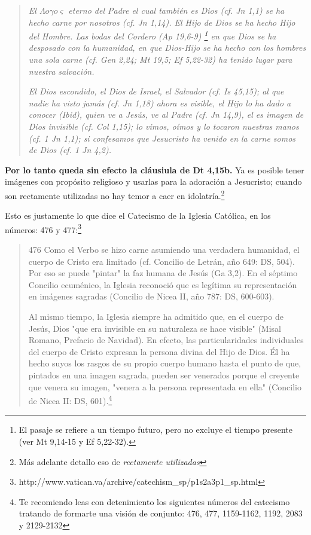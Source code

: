 \documentclass{article}
\begin{document}
\begin{quote}
\emph{El $\Lambda o \gamma o \varsigma$ eterno del Padre el cual tambi\'en es Dios (\emph{cf}. Jn 1,1) se ha hecho \emph{carne} por nosotros (\emph{cf}. Jn 1,14). El Hijo de Dios se ha hecho Hijo del Hombre. Las bodas del Cordero (Ap 19,6-9)%
    \footnote{El pasaje se refiere a un tiempo futuro, pero no excluye el tiempo presente (ver Mt 9,14-15 y Ef 5,22-32).}
en que Dios se ha desposado con la humanidad, en que Dios-Hijo se ha hecho con los hombres una sola carne (\emph{cf}. Gen 2,24; Mt 19,5; Ef 5,22-32) ha tenido lugar para nuestra salvaci\'on.}

\emph{El Dios escondido, el Dios de Israel, el Salvador (\emph{cf}. Is 45,15); al que nadie ha visto jam\'as (\emph{cf}. Jn 1,18) ahora es visible, el Hijo lo ha dado a conocer (\emph{Ibid}), quien ve a Jes\'us, ve al Padre (\emph{cf}. Jn 14,9), el es imagen de Dios invisible (\emph{cf}. Col 1,15); lo vimos, o\'{i}mos y lo tocaron nuestras manos (\emph{cf}. 1 Jn 1,1); si confesamos que Jesucristo ha venido en la carne somos de Dios (\emph{cf}. 1 Jn 4,2).}
\end{quote}

\noindent
\textbf{Por lo tanto queda sin efecto la cl\'ausiula de Dt 4,15b.} Ya es posible tener im\'agenes con prop\'osito religioso y usarlas para la adoraci\'on a Jesucristo; cuando son rectamente utilizadas no hay temor a caer en idolatr\'{i}a.\footnote{M\'as adelante detallo eso de \emph{rectamente utilizadas}} %

Esto es justamente lo que dice el Catecismo de la Iglesia Católica, en los números: 476 y 477:\footnote{http://www.vatican.va/archive/catechism\_sp/p1s2a3p1\_sp.html}

\begin{quote}
476 Como el Verbo se hizo carne asumiendo una verdadera humanidad, el cuerpo de Cristo era limitado (cf. Concilio de Letrán, año 649: DS, 504). Por eso se puede "pintar" la faz humana de Jesús (Ga 3,2). En el séptimo Concilio ecuménico, la Iglesia reconoció que es legítima su representación en imágenes sagradas (Concilio de Nicea II, año 787: DS, 600-603).

 Al mismo tiempo, la Iglesia siempre ha admitido que, en el cuerpo de Jesús, Dios "que era invisible en su naturaleza se hace visible" (Misal Romano, Prefacio de Navidad). En efecto, las particularidades individuales del cuerpo de Cristo expresan la persona divina del Hijo de Dios. Él ha hecho suyos los rasgos de su propio cuerpo humano hasta el punto de que, pintados en una imagen sagrada, pueden ser venerados porque el creyente que venera su imagen, "venera a la persona representada en ella" (Concilio de Nicea II: DS, 601).\footnote{Te recomiendo leas con detenimiento los siguientes números del catecismo tratando de formarte una visión de conjunto: 476, 477, 1159-1162, 1192, 2083 y 2129-2132}
\end{quote}
\end{document}
